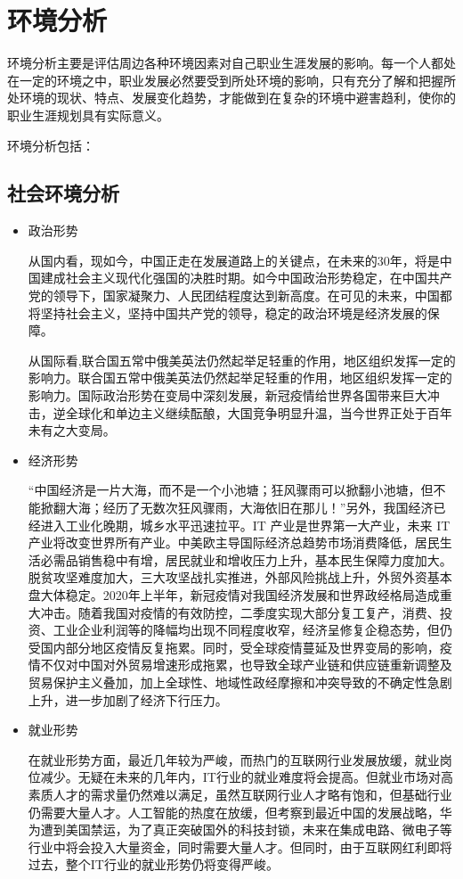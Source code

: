 \documentclass{article}
\begin{document}
\section{环境分析}
环境分析主要是评估周边各种环境因素对自己职业生涯发展的影响。每一个人都处在一定的环境之中，职业发展必然要受到所处环境的影响，只有充分了解和把握所处环境的现状、特点、发展变化趋势，才能做到在复杂的环境中避害趋利，使你的职业生涯规划具有实际意义。\par
环境分析包括：\par
\subsection{社会环境分析}
\begin{itemize}
\item 政治形势\par
从国内看，现如今，中国正走在发展道路上的关键点，在未来的30年，将是中国建成社会主义现代化强国的决胜时期。如今中国政治形势稳定，在中国共产党的领导下，国家凝聚力、人民团结程度达到新高度。在可见的未来，中国都将坚持社会主义，坚持中国共产党的领导，稳定的政治环境是经济发展的保障。\par
从国际看,联合国五常中俄美英法仍然起举足轻重的作用，地区组织发挥一定的影响力。联合国五常中俄美英法仍然起举足轻重的作用，地区组织发挥一定的影响力。国际政治形势在变局中深刻发展，新冠疫情给世界各国带来巨大冲击，逆全球化和单边主义继续酝酿，大国竞争明显升温，当今世界正处于百年未有之大变局。
\item 经济形势\par
“中国经济是一片大海，而不是一个小池塘；狂风骤雨可以掀翻小池塘，但不能掀翻大海；经历了无数次狂风骤雨，大海依旧在那儿！”另外，我国经济已经进入工业化晚期，城乡水平迅速拉平。IT 产业是世界第一大产业，未来 IT 产业将改变世界所有产业。中美欧主导国际经济总趋势市场消费降低，居民生活必需品销售稳中有增，居民就业和增收压力上升，基本民生保障力度加大。脱贫攻坚难度加大，三大攻坚战扎实推进，外部风险挑战上升，外贸外资基本盘大体稳定。2020年上半年，新冠疫情对我国经济发展和世界政经格局造成重大冲击。随着我国对疫情的有效防控，二季度实现大部分复工复产，消费、投资、工业企业利润等的降幅均出现不同程度收窄，经济呈修复企稳态势，但仍受国内部分地区疫情反复拖累。同时，受全球疫情蔓延及世界变局的影响，疫情不仅对中国对外贸易增速形成拖累，也导致全球产业链和供应链重新调整及贸易保护主义叠加，加上全球性、地域性政经摩擦和冲突导致的不确定性急剧上升，进一步加剧了经济下行压力。
\item 就业形势\par
在就业形势方面，最近几年较为严峻，而热门的互联网行业发展放缓，就业岗位减少。无疑在未来的几年内，IT行业的就业难度将会提高。但就业市场对高素质人才的需求量仍然难以满足，虽然互联网行业人才略有饱和，但基础行业仍需要大量人才。人工智能的热度在放缓，但考察到最近中国的发展战略，华为遭到美国禁运，为了真正突破国外的科技封锁，未来在集成电路、微电子等行业中将会投入大量资金，同时需要大量人才。但同时，由于互联网红利即将过去，整个IT行业的就业形势仍将变得严峻。
\end{itemize}
\end{document}
